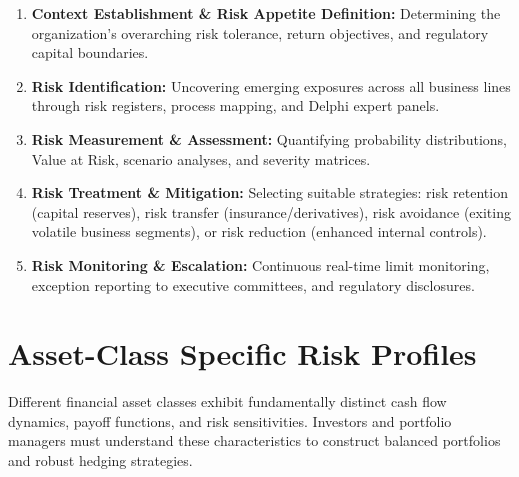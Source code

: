 \begin{enumerate}[leftmargin=1.5em, itemsep=3pt]
    \item \textbf{Context Establishment \& Risk Appetite Definition:} Determining the organization's overarching risk tolerance, return objectives, and regulatory capital boundaries.
    \item \textbf{Risk Identification:} Uncovering emerging exposures across all business lines through risk registers, process mapping, and Delphi expert panels.
    \item \textbf{Risk Measurement \& Assessment:} Quantifying probability distributions, Value at Risk, scenario analyses, and severity matrices.
    \item \textbf{Risk Treatment \& Mitigation:} Selecting suitable strategies: risk retention (capital reserves), risk transfer (insurance/derivatives), risk avoidance (exiting volatile business segments), or risk reduction (enhanced internal controls).
    \item \textbf{Risk Monitoring \& Escalation:} Continuous real-time limit monitoring, exception reporting to executive committees, and regulatory disclosures.
\end{enumerate}

\section{Asset-Class Specific Risk Profiles}

Different financial asset classes exhibit fundamentally distinct cash flow dynamics, payoff functions, and risk sensitivities. Investors and portfolio managers must understand these characteristics to construct balanced portfolios and robust hedging strategies.

